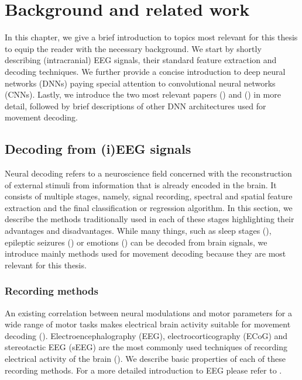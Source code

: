 \chapter{Background and related work}
\label{chap:background}
In this chapter, we give a brief introduction to topics most relevant for this thesis to equip the reader with the necessary background.
We start by shortly describing (intracranial) EEG signals, their standard feature extraction and decoding techniques. We further provide a concise introduction to deep neural networks (DNNs) paying special attention to convolutional neural networks (CNNs).
Lastly, we introduce the two most relevant papers (\cite{Hammer-2021}) and (\cite{schirrmeister-deep-2017}) in more detail, followed by brief descriptions of other DNN architectures used for movement decoding.

\section{Decoding from (i)EEG signals}
Neural decoding refers to a neuroscience field concerned with the reconstruction of external stimuli from information that is already encoded in the brain.
It consists of multiple stages, namely, signal recording, spectral and spatial feature extraction and the final classification or regression algorithm. 
In this section, we describe the methods traditionally used in each of these stages highlighting their advantages and disadvantages. 
While many things, such as sleep stages (\cite{sleep-eegnet}), epileptic seizures (\cite{epileptic-seizures-eeg}) or emotions (\cite{emotion-eeg}) can be decoded from brain signals, we introduce mainly methods used for movement decoding because they are most relevant for this thesis. 

\subsection{Recording methods}
An existing correlation between neural modulations and motor parameters for a wide range of motor tasks makes electrical brain activity suitable for movement decoding  (\cite{lebedev-cortical-2005}).
Electroencephalography (EEG), electrocorticography (ECoG) and stereotactic EEG (sEEG) are the most commonly used techniques of recording electrical activity of the brain (\cite{tam-human-2019}).
We describe basic properties of each of these recording methods. For a more detailed introduction to EEG please refer to \cite{NiedermeyersElectroencephalography}.

